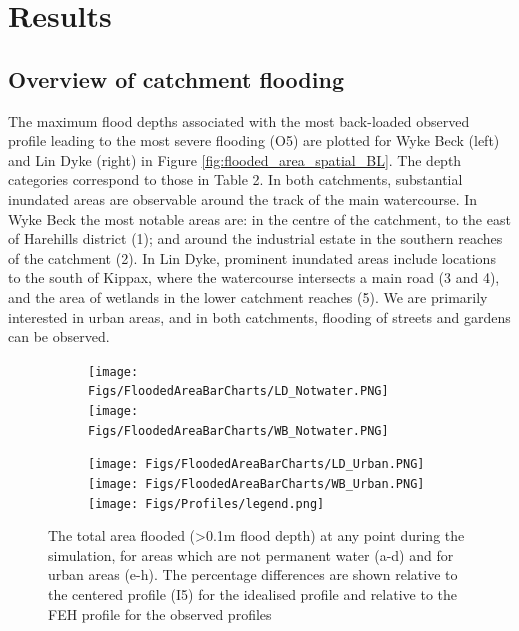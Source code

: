\documentclass[APA,Times2COL]{WileyNJDv5}
\begin{document}
\section{Results}\label{sec:results}

\subsection{Overview of catchment flooding}\label{subsec:overview}

The maximum flood depths associated with the most back-loaded observed profile leading to the most severe flooding (O5) are plotted for Wyke Beck (left) and Lin Dyke (right) in Figure \ref{fig:flooded_area_spatial_BL}. The depth categories correspond to those in Table 2. In both catchments, substantial inundated areas are observable around the track of the main watercourse. In Wyke Beck the most notable areas are: in the centre of the catchment, to the east of Harehills district (1); and around the industrial estate in the southern reaches of the catchment (2). In Lin Dyke, prominent inundated areas include locations to the south of Kippax, where the watercourse intersects a main road (3 and 4), and the area of wetlands in the lower catchment reaches (5). We are primarily interested in urban areas, and in both catchments, flooding of streets and gardens can be observed.

\begin{figure}[h!]
  \begin{subfigure}[b]{\textwidth}
    \centering
    \texttt{[image: Figs/FloodedAreaBarCharts/LD\_Notwater.PNG]}
    \texttt{[image: Figs/FloodedAreaBarCharts/WB\_Notwater.PNG]}
  \end{subfigure}
  \begin{subfigure}[b]{\textwidth}
    \centering
    \texttt{[image: Figs/FloodedAreaBarCharts/LD\_Urban.PNG]}
    \texttt{[image: Figs/FloodedAreaBarCharts/WB\_Urban.PNG]}
    \centering
    \texttt{[image: Figs/Profiles/legend.png]}
  \end{subfigure}
\caption{The total area flooded (\textgreater 0.1m flood depth) at any point during the simulation, for areas which are not permanent water (a-d) and for urban areas (e-h). The percentage differences are shown relative to the centered profile (I5) for the idealised profile and relative to the FEH profile for the observed profiles} \label{fig:total_flooded_area} 
\end{figure}
\end{document}

